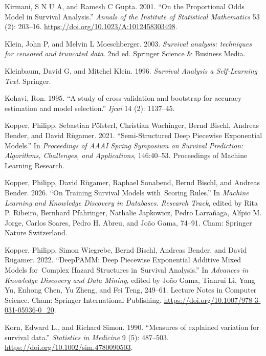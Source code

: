 \documentclass[
  letterpaper,
  krantz2]{style/krantz}
\newlength{\cslhangindent}
\newenvironment{CSLReferences}[2] %
 {\begin{list}{}{%
  \setlength{\itemindent}{0pt}
  \setlength{\leftmargin}{0pt}
  \setlength{\parsep}{0pt}
  \ifodd #1
   \setlength{\leftmargin}{\cslhangindent}
   \setlength{\itemindent}{-1\cslhangindent}
  \fi
  \setlength{\itemsep}{#2\baselineskip}}}
 {\end{list}}
\begin{document}
\begin{CSLReferences}{1}{0}
Kirmani, S N U A, and Ramesh C Gupta. 2001. {``{On the Proportional Odds
Model in Survival Analysis}.''} \emph{Annals of the Institute of
Statistical Mathematics} 53 (2): 203--16.
\url{https://doi.org/10.1023/A:1012458303498}.

Klein, John P, and Melvin L Moeschberger. 2003. \emph{{Survival
analysis: techniques for censored and truncated data}}. 2nd ed. Springer
Science \& Business Media.

Kleinbaum, David G, and Mitchel Klein. 1996. \emph{Survival Analysis a
Self-Learning Text}. Springer.

Kohavi, Ron. 1995. {``{A study of cross-validation and bootstrap for
accuracy estimation and model selection}.''} \emph{Ijcai} 14 (2):
1137--45.

Kopper, Philipp, Sebastian Pölsterl, Christian Wachinger, Bernd Bischl,
Andreas Bender, and David Rügamer. 2021. {``{Semi-Structured Deep
Piecewise Exponential Models}.''} In \emph{Proceedings of AAAI Spring
Symposium on Survival Prediction: Algorithms, Challenges, and
Applications}, 146:40--53. Proceedings of Machine Learning Research.

Kopper, Philipp, David Rügamer, Raphael Sonabend, Bernd Bischl, and
Andreas Bender. 2026. {``On Training Survival Models with~Scoring
Rules.''} In \emph{Machine Learning and Knowledge Discovery in
Databases. Research Track}, edited by Rita P. Ribeiro, Bernhard
Pfahringer, Nathalie Japkowicz, Pedro Larrañaga, Alípio M. Jorge, Carlos
Soares, Pedro H. Abreu, and João Gama, 74--91. Cham: Springer Nature
Switzerland.

Kopper, Philipp, Simon Wiegrebe, Bernd Bischl, Andreas Bender, and David
Rügamer. 2022. {``{DeepPAMM}: {Deep Piecewise Exponential Additive Mixed
Models} for~{Complex Hazard Structures} in~{Survival Analysis}.''} In
\emph{Advances in {Knowledge Discovery} and {Data Mining}}, edited by
João Gama, Tianrui Li, Yang Yu, Enhong Chen, Yu Zheng, and Fei Teng,
249--61. Lecture {Notes} in {Computer Science}. Cham: Springer
International Publishing.
\url{https://doi.org/10.1007/978-3-031-05936-0_20}.

Korn, Edward L., and Richard Simon. 1990. {``{Measures of explained
variation for survival data}.''} \emph{Statistics in Medicine} 9 (5):
487--503. \url{https://doi.org/10.1002/sim.4780090503}.


\end{CSLReferences}
\end{document}
